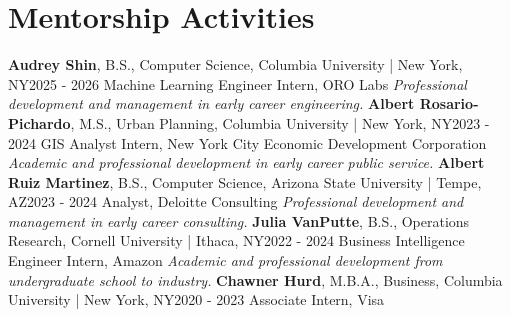 \documentclass{article}
\begin{document}
    \section*{Mentorship Activities}
        \textbf{Audrey Shin}, B.S., Computer Science, Columbia University | New York, NY\hfill{2025 - 2026}\newline
        Machine Learning Engineer Intern, ORO Labs\newline
        \textit{Professional development and management in early career engineering.}\newline\newline
        \textbf{Albert Rosario-Pichardo}, M.S., Urban Planning, Columbia University | New York, NY\hfill{2023 - 2024}\newline
        GIS Analyst Intern, New York City Economic Development Corporation\newline
        \textit{Academic and professional development in early career public service.}\newline\newline
        \textbf{Albert Ruiz Martinez}, B.S., Computer Science, Arizona State University | Tempe, AZ\hfill{2023 - 2024}\newline
        Analyst, Deloitte Consulting\newline
        \textit{Professional development and management in early career consulting.}\newline\newline
        \textbf{Julia VanPutte}, B.S., Operations Research, Cornell University | Ithaca, NY\hfill{2022 - 2024}\newline
        Business Intelligence Engineer Intern, Amazon\newline
        \textit{Academic and professional development from undergraduate school to industry.}\newline\newline
        \textbf{Chawner Hurd}, M.B.A., Business, Columbia University | New York, NY\hfill{2020 - 2023}\newline
        Associate Intern, Visa\newline
\end{document}
